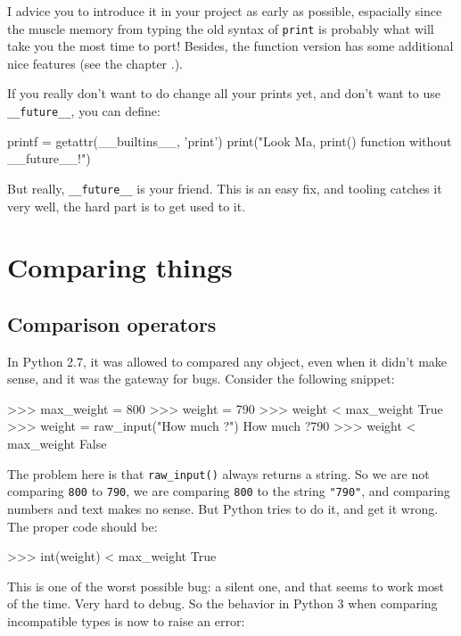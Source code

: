I advice you to introduce it in your project as early as possible, espacially since the muscle memory from typing the old syntax of \lstinline{print} is probably what will take you the most time to port! Besides, the function version has some additional nice features (see the chapter .).

If you really don't want to do change all your prints yet, and don't want to use \lstinline{__future__}, you can define:

\begin{py2and3}
printf = getattr(__builtins__, 'print')
print("Look Ma, print() function without __future__!")
\end{py2and3}

But really, \lstinline{__future__} is your friend. This is an easy fix, and tooling catches it very well, the hard part is to get used to it.

\section{Comparing things}

\subsection{Comparison operators}

In Python 2.7, it was allowed to compared any object, even when it didn't make sense, and it was the gateway for bugs. Consider the following snippet:

\begin{py2}
>>> max_weight = 800
>>> weight = 790
>>> weight < max_weight
True
>>> weight = raw_input("How much ?")
How much ?790
>>> weight < max_weight
False
\end{py2}

The problem here is that \lstinline{raw_input()} always returns a string. So we are not comparing \lstinline{800} to \lstinline{790}, we are comparing \lstinline{800} to the string \lstinline{"790"}, and comparing numbers and text makes no sense. But Python tries to do it, and get it wrong. The proper code should be:

\begin{py2}
>>> int(weight) < max_weight
True
\end{py2}

This is one of the worst possible bug: a silent one, and that seems to work most of the time. Very hard to debug. So the behavior in Python 3 when comparing incompatible types is now to raise an error:

